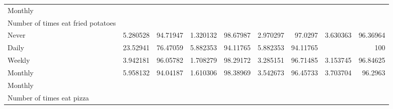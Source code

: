 \documentclass{article}
\begin{document}
\begin{tabular}{lllllllll}
\multicolumn{1}{l}{\hspace{5em}Monthly} &
  \multicolumn{1}{|r}{} &
  \multicolumn{1}{r}{} &
  \multicolumn{1}{r}{} &
  \multicolumn{1}{r}{} &
  \multicolumn{1}{r}{} &
  \multicolumn{1}{r}{} &
  \multicolumn{1}{r}{} &
  \multicolumn{1}{r}{} \\
\multicolumn{1}{l}{\hspace{6em}Number of times eat fried potatoes} &
  \multicolumn{1}{|r}{} &
  \multicolumn{1}{r}{} &
  \multicolumn{1}{r}{} &
  \multicolumn{1}{r}{} &
  \multicolumn{1}{r}{} &
  \multicolumn{1}{r}{} &
  \multicolumn{1}{r}{} &
  \multicolumn{1}{r}{} \\
\multicolumn{1}{l}{\hspace{7em}Never} &
  \multicolumn{1}{|r}{5.280528} &
  \multicolumn{1}{r}{94.71947} &
  \multicolumn{1}{r}{1.320132} &
  \multicolumn{1}{r}{98.67987} &
  \multicolumn{1}{r}{2.970297} &
  \multicolumn{1}{r}{97.0297} &
  \multicolumn{1}{r}{3.630363} &
  \multicolumn{1}{r}{96.36964} \\
\multicolumn{1}{l}{\hspace{7em}Daily} &
  \multicolumn{1}{|r}{23.52941} &
  \multicolumn{1}{r}{76.47059} &
  \multicolumn{1}{r}{5.882353} &
  \multicolumn{1}{r}{94.11765} &
  \multicolumn{1}{r}{5.882353} &
  \multicolumn{1}{r}{94.11765} &
  \multicolumn{1}{r}{} &
  \multicolumn{1}{r}{100} \\
\multicolumn{1}{l}{\hspace{7em}Weekly} &
  \multicolumn{1}{|r}{3.942181} &
  \multicolumn{1}{r}{96.05782} &
  \multicolumn{1}{r}{1.708279} &
  \multicolumn{1}{r}{98.29172} &
  \multicolumn{1}{r}{3.285151} &
  \multicolumn{1}{r}{96.71485} &
  \multicolumn{1}{r}{3.153745} &
  \multicolumn{1}{r}{96.84625} \\
\multicolumn{1}{l}{\hspace{7em}Monthly} &
  \multicolumn{1}{|r}{5.958132} &
  \multicolumn{1}{r}{94.04187} &
  \multicolumn{1}{r}{1.610306} &
  \multicolumn{1}{r}{98.38969} &
  \multicolumn{1}{r}{3.542673} &
  \multicolumn{1}{r}{96.45733} &
  \multicolumn{1}{r}{3.703704} &
  \multicolumn{1}{r}{96.2963} \\
\multicolumn{1}{l}{\hspace{3em}Monthly} &
  \multicolumn{1}{|r}{} &
  \multicolumn{1}{r}{} &
  \multicolumn{1}{r}{} &
  \multicolumn{1}{r}{} &
  \multicolumn{1}{r}{} &
  \multicolumn{1}{r}{} &
  \multicolumn{1}{r}{} &
  \multicolumn{1}{r}{} \\
\multicolumn{1}{l}{\hspace{4em}Number of times eat pizza} &

\end{tabular}
\end{document}
